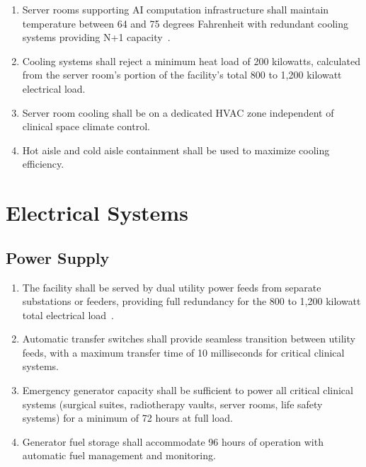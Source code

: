 \begin{enumerate}[label=(\alph*)]
\item Server rooms supporting AI computation infrastructure shall maintain
  temperature between 64 and 75 degrees Fahrenheit with redundant cooling
  systems providing N+1 capacity~\cite{sitespec2026}.

\item Cooling systems shall reject a minimum heat load of 200 kilowatts,
  calculated from the server room's portion of the facility's total 800 to
  1,200 kilowatt electrical load.

\item Server room cooling shall be on a dedicated HVAC zone independent of
  clinical space climate control.

\item Hot aisle and cold aisle containment shall be used to maximize cooling
  efficiency.
\end{enumerate}

\section{Electrical Systems}

\subsection{Power Supply}

\begin{enumerate}[label=(\alph*)]
\item The facility shall be served by dual utility power feeds from separate
  substations or feeders, providing full redundancy for the 800 to 1,200
  kilowatt total electrical load~\cite{sitespec2026}.

\item Automatic transfer switches shall provide seamless transition between
  utility feeds, with a maximum transfer time of 10 milliseconds for critical
  clinical systems.

\item Emergency generator capacity shall be sufficient to power all critical
  clinical systems (surgical suites, radiotherapy vaults, server rooms,
  life safety systems) for a minimum of 72 hours at full load.

\item Generator fuel storage shall accommodate 96 hours of operation with
  automatic fuel management and monitoring.
\end{enumerate}


